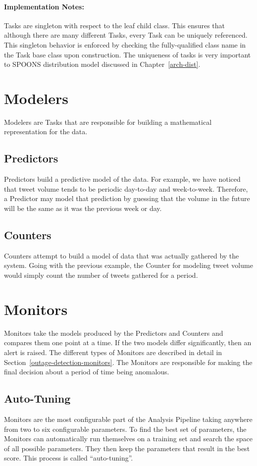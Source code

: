 \documentclass[12pt]{ucthesis}
\begin{document}
\paragraph{Implementation Notes:}
Tasks are singleton with respect to the leaf child class.
This ensures that although there are many different Tasks, every Task can be uniquely referenced.
This singleton behavior is enforced by checking the fully-qualified class name in the Task base class upon construction.
The uniqueness of tasks is very important to SPOONS distribution model discussed in Chapter~\ref{arch-dist}.

\section{Modelers}
\label{arch-modelers}
Modelers are Tasks that are responsible for building a mathematical representation for the data.

\subsection{Predictors}
\label{arch-predictors}
Predictors build a predictive model of the data. For example, we have noticed that tweet volume tends to be
periodic day-to-day and week-to-week. Therefore, a Predictor may model that prediction by guessing that the volume
in the future will be the same as it was the previous week or day.

\subsection{Counters}
\label{arch-counters}
Counters attempt to build a model of data that was actually gathered by the system. Going with the previous example,
the Counter for modeling tweet volume would simply count the number of tweets gathered for a period.

\section{Monitors}
\label{arch-monitors}
Monitors take the models produced by the Predictors and Counters and compares them one point at a time.
If the two models differ significantly, then an alert is raised.
The different types of Monitors are described in detail in Section~\ref{outage-detection-monitors}.
The Monitors are responsible for making the final decision about a period of time being anomalous.

\subsection{Auto-Tuning}
\label{arch-autotuning}
Monitors are the most configurable part of the Analysis Pipeline taking anywhere from two to six configurable parameters.
To find the best set of parameters, the Monitors can automatically run themselves on a training set and search the space of all possible parameters.
They then keep the parameters that result in the best score.
This process is called ``auto-tuning''.
\end{document}
